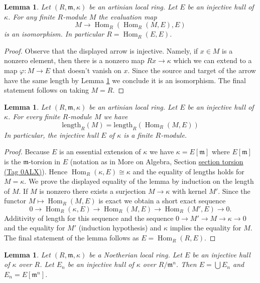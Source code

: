\documentclass{amsart}
\theoremstyle{plain}
\newtheorem{lemma}[subsection]{Lemma}
\theoremstyle{definition}
\theoremstyle{remark}
\numberwithin{equation}{subsection}
\def\Hom{\mathop{\mathrm{Hom}}\nolimits}
\begin{document}
\begin{lemma}
\label{lemma-evaluate}
Let $(R, \mathfrak m, \kappa)$ be an artinian local ring.
Let $E$ be an injective hull of $\kappa$.
For any finite $R$-module $M$ the evaluation map
$$
M \longrightarrow \Hom_R(\Hom_R(M, E), E)
$$
is an isomorphism. In particular $R = \Hom_R(E, E)$.
\end{lemma}

\begin{proof}
Observe that the displayed arrow is injective. Namely, if $x \in M$ is
a nonzero element, then there is a nonzero map $Rx \to \kappa$ which
we can extend to a map $\varphi : M \to E$ that doesn't vanish on $x$.
Since the source and target of the arrow have the same length by
Lemma \ref{lemma-finite}
we conclude it is an isomorphism. The final statement follows
on taking $M = R$.
\end{proof}


\begin{lemma}
\label{lemma-finite}
Let $(R, \mathfrak m, \kappa)$ be an artinian local ring.
Let $E$ be an injective hull of $\kappa$. For every finite
$R$-module $M$ we have
$$
\text{length}_R(M) = \text{length}_R(\Hom_R(M, E))
$$
In particular, the injective hull $E$ of $\kappa$ is a finite $R$-module.
\end{lemma}

\begin{proof}
Because $E$ is an essential extension of $\kappa$ we have
$\kappa = E[\mathfrak m]$ where $E[\mathfrak m]$ is the
$\mathfrak m$-torsion in $E$ (notation as in More on Algebra, Section
\href{https://stacks.math.columbia.edu/tag/0ALX}{section torsion (Tag 0ALX)}).
Hence $\Hom_R(\kappa, E) \cong \kappa$ and the equality of lengths
holds for $M = \kappa$. We prove the displayed equality of the lemma
by induction on the length of $M$. If $M$ is nonzero there exists a surjection
$M \to \kappa$ with kernel $M'$. Since the functor $M \mapsto \Hom_R(M, E)$
is exact we obtain a short exact sequence
$$
0 \to \Hom_R(\kappa, E) \to \Hom_R(M, E) \to \Hom_R(M', E) \to 0.
$$
Additivity of length for this sequence and the sequence
$0 \to M' \to M \to \kappa \to 0$ and the equality for $M'$ (induction
hypothesis) and $\kappa$ implies the equality for $M$.
The final statement of the lemma follows as $E = \Hom_R(R, E)$.
\end{proof}


\begin{lemma}
\label{lemma-union-artinian}
Let $(R, \mathfrak m, \kappa)$ be a Noetherian local ring.
Let $E$ be an injective hull of $\kappa$ over $R$.
Let $E_n$ be an injective hull of $\kappa$ over $R/\mathfrak m^n$.
Then $E = \bigcup E_n$ and $E_n = E[\mathfrak m^n]$.
\end{lemma}
\end{document}
